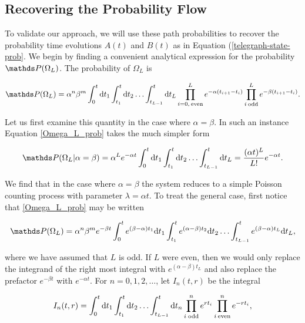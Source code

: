 \subsection{Recovering the Probability Flow}
To validate our approach, we will use these path probabilities to recover the probability time evolutions $A(t)$ and $B(t)$ as in Equation (\ref{telegraph-state-prob}. We begin by finding a convenient analytical expression for the probability $\bP(\Omega_L)$. The probability of $\Omega_L$ is

\begin{equation}\label{Omega_L_prob}
  \bP(\Omega_L) = \alpha^n\beta^m  \int^{t}_{0}\rmd t_1\int^{t}_{t_1}\rmd t_2\ldots \int^{t}_{t_{L-1}}\rmd t_L\prod_{i =0, \:\text{even}}^{L} e^{-\alpha(t_{i+1} - t_{i})} \prod_{i \: \text{odd}}^L e^{-\beta(t_{i+1} - t_{i})}.
\end{equation}

Let us first examine this quantity in the case where $\alpha = \beta$. In such an instance Equation \ref{Omega_L_prob} takes the much simpler form

\begin{equation}\label{alpha_eq_beta}
  \bP(\Omega_L | \alpha = \beta) = \alpha^L e^{-\alpha t}  \int^{t}_{0}\rmd t_1\int^{t}_{t_1}\rmd t_2\ldots \int^{t}_{t_{L-1}}\rmd t_L = \frac{(\alpha t)^L}{L!}e^{-\alpha t}.
\end{equation}

We find that in the case where $\alpha = \beta$ the system reduces to a simple Poisson counting process with parameter $\lambda = \alpha t$. To treat the general case, first notice that \ref{Omega_L_prob} may be written

\begin{equation}
\bP(\Omega_L) = \alpha^n\beta^m e^{-\beta t} \int_0^t e^{(\beta - \alpha)t_1}\rmd t_1\int_{t_1}^t e^{(\alpha -\beta)t_2}\rmd t_2\ldots \int_{t_{L-1}}^t e^{(\beta - \alpha)t_L}\rmd t_L,
\end{equation}

where we have assumed that $L$ is odd. If $L$ were even, then we would only replace the integrand of the right most integral with $e^{(\alpha -\beta)t_L}$ and also replace the prefactor $e^{-\beta t}$ with $e^{-\alpha t}$. For $n = 0,1,2, \ldots$, let $I_n(t,r)$ be the integral 



 \begin{align}
    I_n(t,r)= \int_0^t \mathrm{d} t_1\int_{t_1}^t \mathrm{d} t_2\ldots \int_{t_{L-1}}^t \mathrm{d} t_n \prod_{i \; \text{odd}}^n e^{rt_i} \prod_{i \: \text{even}}^n e^{-rt_i},
 \end{align}


